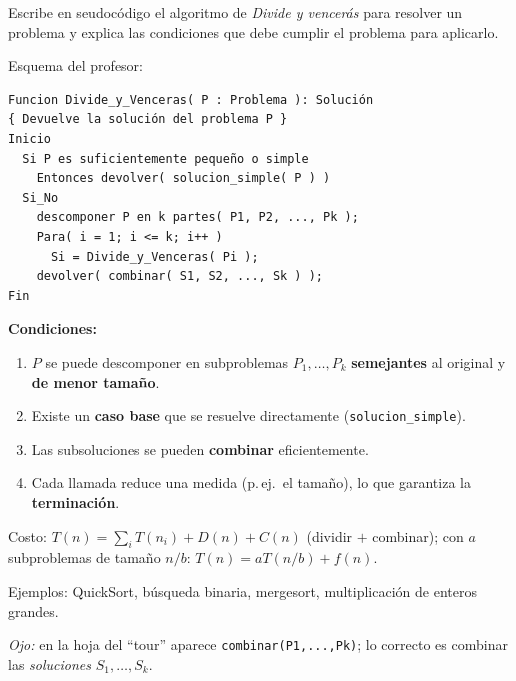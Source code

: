 \begin{prob}[\examen]
Escribe en seudocódigo el algoritmo de \emph{Divide y vencerás} para resolver un problema y explica las condiciones que debe cumplir el problema para aplicarlo.
\end{prob}
\begin{sol}
Esquema del profesor:
\begin{lstlisting}
Funcion Divide_y_Venceras( P : Problema ): Solución
{ Devuelve la solución del problema P }
Inicio
  Si P es suficientemente pequeño o simple
    Entonces devolver( solucion_simple( P ) )
  Si_No
    descomponer P en k partes( P1, P2, ..., Pk );
    Para( i = 1; i <= k; i++ )
      Si = Divide_y_Venceras( Pi );
    devolver( combinar( S1, S2, ..., Sk ) );
Fin
\end{lstlisting}
\textbf{Condiciones:}
\begin{enumerate}
\item $P$ se puede descomponer en subproblemas $P_1,\dots,P_k$ \textbf{semejantes} al original y \textbf{de menor tamaño}.
\item Existe un \textbf{caso base} que se resuelve directamente (\texttt{solucion\_simple}).
\item Las subsoluciones se pueden \textbf{combinar} eficientemente.
\item Cada llamada reduce una medida (p.\,ej.\ el tamaño), lo que garantiza la \textbf{terminación}.
\end{enumerate}
Costo: $T(n)=\sum_i T(n_i)+D(n)+C(n)$ (dividir $+$ combinar); con $a$ subproblemas de tamaño $n/b$: $T(n)=aT(n/b)+f(n)$.

Ejemplos: QuickSort, búsqueda binaria, mergesort, multiplicación de enteros grandes.

\emph{Ojo:} en la hoja del ``tour'' aparece \texttt{combinar(P1,...,Pk)}; lo correcto es combinar las \emph{soluciones} $S_1,\dots,S_k$.
\end{sol}

